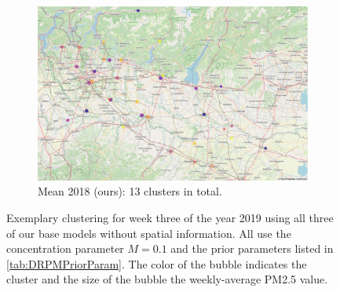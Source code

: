 \documentclass[12pt,a4paper]{article}
\begin{document}
\begin{figure}
\begin{subfigure}[b]{0.49\textwidth}
         \includegraphics[width=\textwidth]{./imgs/drpm/drpm_base_clustering_mean_prev_year.png}
         \caption{Mean 2018 (ours): 13 clusters in total.}
         \label{fig:DRPMMeanPreviousYear}
     \end{subfigure}
        \caption{Exemplary clustering for week three of the year 2019 using all three of
        our base models without spatial information. All use the concentration parameter
        $M=0.1$ and the prior parameters listed in \cref{tab:DRPMPriorParam}. The color of
        the bubble indicates the cluster and the size of the bubble the weekly-average PM2.5 value.}
        \label{fig:DRPMClusteringBaseModels}
\end{figure}
\end{document}
